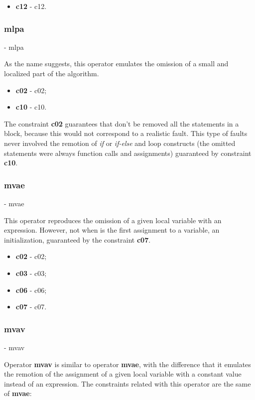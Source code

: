	\begin{itemize}
		\item \textbf{\acs{c12}} - \Acl{c12}.
	\end{itemize}

	\subsubsection{\textbf{\acs{mlpa}}} - \Acl{mlpa}

	As the name suggests, this operator emulates the omission of a small and localized part of the algorithm.

	\begin{itemize}
		\item \textbf{\acs{c02}} - \Acl{c02};
		\item \textbf{\acs{c10}} - \Acl{c10}.
	\end{itemize}

	The constraint \textbf{\ac{c02}} guarantees that don't be removed all the statements in a block, because this would not correspond to a realistic fault. This type of faults never involved the remotion of \textit{if} or \textit{if-else} and loop constructs (the omitted statements were always function calls and assignments) guaranteed by constraint \textbf{\ac{c10}}.

	\subsubsection{\textbf{\acs{mvae}}} - \Acl{mvae}

	This operator reproduces the omission of a given local variable with an expression. However, not when is the first assignment to a variable, an initialization, guaranteed by the constraint \textbf{\acs{c07}}.

	\begin{itemize}
		\item \textbf{\acs{c02}} - \Acl{c02};
		\item \textbf{\acs{c03}} - \Acl{c03};
		\item \textbf{\acs{c06}} - \Acl{c06};
		\item \textbf{\acs{c07}} - \Acl{c07}.
	\end{itemize}

	\subsubsection{\textbf{\acs{mvav}}} - \Acl{mvav}

	Operator \textbf{\ac{mvav}} is similar to operator \textbf{\ac{mvae}}, with the difference that it emulates the remotion of the assignment of a given local variable with a constant value instead of an expression. The constraints related with this operator are the same of \textbf{\ac{mvae}}:


